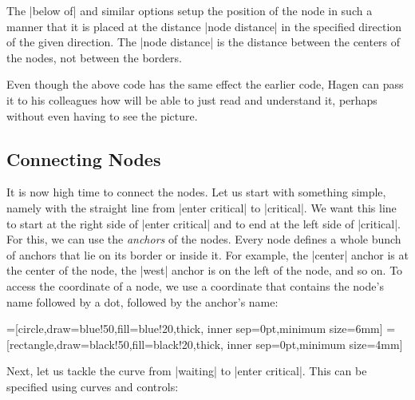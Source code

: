 The |below of| and similar options setup the position of the node in
such a manner that it is placed at the distance |node distance| in the
specified direction of the given direction. The |node distance| is the
distance between the centers of the nodes, not between the borders.

Even though the above code has the same effect the earlier code, Hagen
can pass it to his colleagues how will be able to just read and
understand it, perhaps without even having to see the picture.


\subsection{Connecting Nodes}

It is now high time to connect the nodes. Let us start with something
simple, namely with the straight line from |enter critical| to
|critical|. We want this line to start at the right side of
|enter critical| and to end at the left side of |critical|. For
this, we can use the \emph{anchors} of the nodes. Every node defines a
whole bunch of anchors that lie on its border or inside it. For
example, the |center| anchor is at the center of the node, the |west|
anchor is on the left of the node, and so on. To access the coordinate
of a node, we use a coordinate that contains the node's name followed
by a dot, followed by the anchor's name:

{
=[circle,draw=blue!50,fill=blue!20,thick,
                   inner sep=0pt,minimum size=6mm]
=[rectangle,draw=black!50,fill=black!20,thick,
                        inner sep=0pt,minimum size=4mm]
\begin{codeexample}[]
\end{codeexample}
}

Next, let us tackle the curve from |waiting| to |enter critical|. This
can be specified using curves and controls:

